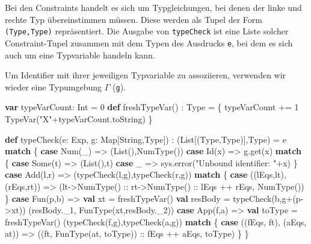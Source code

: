 \documentclass[]{article}
\newenvironment{Shaded}{}{}
\newcommand{\DecValTok}[1]{\textcolor[rgb]{0.25,0.63,0.44}{#1}}
\newcommand{\FunctionTok}[1]{\textcolor[rgb]{0.02,0.16,0.49}{#1}}
\newcommand{\KeywordTok}[1]{\textcolor[rgb]{0.00,0.44,0.13}{\textbf{#1}}}
\newcommand{\NormalTok}[1]{#1}
\newcommand{\StringTok}[1]{\textcolor[rgb]{0.25,0.44,0.63}{#1}}
\begin{document}
Bei den Constraints handelt es sich um Typgleichungen, bei denen der
linke und rechte Typ übereinstimmen müssen. Diese werden als Tupel der
Form \texttt{(Type,Type)} repräsentiert. Die Ausgabe von
\texttt{typeCheck} ist eine Liste solcher Constraint-Tupel zusammen mit
dem Typen des Ausdrucks \texttt{e}, bei dem es sich auch um eine
Typvariable handeln kann.

Um Identifier mit ihrer jeweiligen Typvariable zu assoziieren, verwenden
wir wieder eine Typumgebung \(\Gamma\) (\texttt{g}).

\begin{Shaded}
\begin{Highlighting}[]
\KeywordTok{var}\NormalTok{ typeVarCount: Int = }\DecValTok{0}
\KeywordTok{def} \FunctionTok{freshTypeVar}\NormalTok{() : Type = \{}
\NormalTok{  typeVarCount += }\DecValTok{1}
  \FunctionTok{TypeVar}\NormalTok{(}\StringTok{"X"}\NormalTok{+typeVarCount.}\FunctionTok{toString}\NormalTok{)}
\NormalTok{\}}

\KeywordTok{def} \FunctionTok{typeCheck}\NormalTok{(e: Exp, g: Map[String,Type]) : (List[(Type,Type)],Type) = e }\KeywordTok{match}\NormalTok{ \{}
  \KeywordTok{case} \FunctionTok{Num}\NormalTok{(\_) =\textgreater{} (List(),}\FunctionTok{NumType}\NormalTok{())}
  \KeywordTok{case} \FunctionTok{Id}\NormalTok{(x) =\textgreater{} g.}\FunctionTok{get}\NormalTok{(x) }\KeywordTok{match}\NormalTok{ \{}
    \KeywordTok{case}\NormalTok{ Some(t) =\textgreater{} (List(),t)}
    \KeywordTok{case}\NormalTok{ \_ =\textgreater{} sys.}\FunctionTok{error}\NormalTok{(}\StringTok{"Unbound identifier: "}\NormalTok{+x)}
\NormalTok{  \}}
  \KeywordTok{case} \FunctionTok{Add}\NormalTok{(l,r) =\textgreater{} (}\FunctionTok{typeCheck}\NormalTok{(l,g),}\FunctionTok{typeCheck}\NormalTok{(r,g)) }\KeywordTok{match}\NormalTok{ \{}
    \KeywordTok{case}\NormalTok{ ((lEqs,lt),(rEqs,rt)) =\textgreater{} }
\NormalTok{      (lt{-}\textgreater{}}\FunctionTok{NumType}\NormalTok{() :: rt{-}\textgreater{}}\FunctionTok{NumType}\NormalTok{() :: lEqs ++ rEqs, }\FunctionTok{NumType}\NormalTok{())}
\NormalTok{  \}}
  \KeywordTok{case} \FunctionTok{Fun}\NormalTok{(p,b) =\textgreater{}}
    \KeywordTok{val}\NormalTok{ xt = }\FunctionTok{freshTypeVar}\NormalTok{()}
    \KeywordTok{val}\NormalTok{ resBody = }\FunctionTok{typeCheck}\NormalTok{(b,g+(p{-}\textgreater{}xt))}
\NormalTok{    (resBody.}\FunctionTok{\_1}\NormalTok{, }\FunctionTok{FunType}\NormalTok{(xt,resBody.}\FunctionTok{\_2}\NormalTok{))}
  \KeywordTok{case} \FunctionTok{App}\NormalTok{(f,a) =\textgreater{}}
    \KeywordTok{val}\NormalTok{ toType = }\FunctionTok{freshTypeVar}\NormalTok{()}
\NormalTok{    (}\FunctionTok{typeCheck}\NormalTok{(f,g),}\FunctionTok{typeCheck}\NormalTok{(a,g)) }\KeywordTok{match}\NormalTok{ \{}
      \KeywordTok{case}\NormalTok{ ((fEqs, ft), (aEqs, at)) =\textgreater{} }
\NormalTok{        ((ft, }\FunctionTok{FunType}\NormalTok{(at, toType)) :: fEqs ++ aEqs, toType)}
\NormalTok{    \}}
\NormalTok{\}}
\end{Highlighting}
\end{Shaded}
\end{document}
